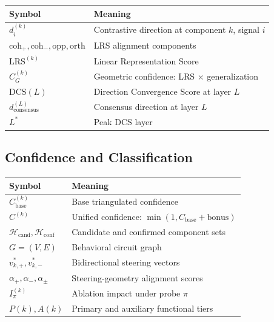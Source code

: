 \documentclass[11pt]{article}
\begin{document}
\begin{center}
\begin{tabular}{ll}
\toprule
\textbf{Symbol} & \textbf{Meaning} \\
\midrule
$d^{(k)}_i$ & Contrastive direction at component $k$, signal $i$ \\
$\text{coh}_+, \text{coh}_-, \text{opp}, \text{orth}$ & LRS alignment components \\
$\text{LRS}^{(k)}$ & Linear Representation Score \\
$C^{(k)}_G$ & Geometric confidence: LRS $\times$ generalization \\
$\text{DCS}(L)$ & Direction Convergence Score at layer $L$ \\
$d^{(L)}_{\text{consensus}}$ & Consensus direction at layer $L$ \\
$L^*$ & Peak DCS layer \\
\bottomrule
\end{tabular}
\end{center}

\subsection{Confidence and Classification}

\begin{center}
\begin{tabular}{ll}
\toprule
\textbf{Symbol} & \textbf{Meaning} \\
\midrule
$C^{(k)}_{\text{base}}$ & Base triangulated confidence \\
$C^{(k)}$ & Unified confidence: $\min(1, C_{\text{base}} + \text{bonus})$ \\
$\mathcal{H}_{\text{cand}}, \mathcal{H}_{\text{conf}}$ & Candidate and confirmed component sets \\
$G = (V, E)$ & Behavioral circuit graph \\
$v^*_{k,+}, v^*_{k,-}$ & Bidirectional steering vectors \\
$\alpha_+, \alpha_-, \alpha_\pm$ & Steering-geometry alignment scores \\
$I^{(k)}_\pi$ & Ablation impact under probe $\pi$ \\
$P(k), A(k)$ & Primary and auxiliary functional tiers \\
\bottomrule
\end{tabular}
\end{center}


\end{document}
